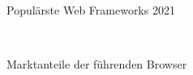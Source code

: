 \begin{figure}[hbt!]
	\centering
	\begin{minipage}[t]{0.6\textwidth}	
		\caption{Populärste Web Frameworks 2021}
		\\ %
		\label{fig:WebFrameworks}
	\end{minipage}
\end{figure}

\newpage
\begin{figure}[hbt!]
	\centering
	\begin{minipage}[t]{0.8\textwidth}	
		\caption{Marktanteile der führenden Browser}
		\\ %
		\label{fig:StatistikBrowser}
	\end{minipage}
\end{figure}

